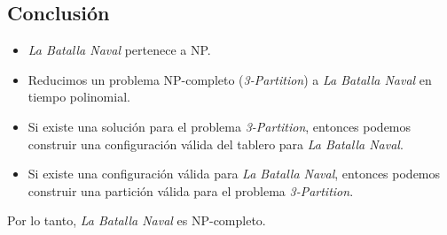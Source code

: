 \subsection*{Conclusión}

\begin{itemize}
    \item \textit{La Batalla Naval} pertenece a NP.
    \item Reducimos un problema NP-completo (\textit{3-Partition}) a \textit{La Batalla Naval} en tiempo polinomial.
    \item Si existe una solución para el problema \textit{3-Partition}, entonces podemos construir una configuración válida del tablero para \textit{La Batalla Naval}.
    \item Si existe una configuración válida para \textit{La Batalla Naval}, entonces podemos construir una partición válida para el problema \textit{3-Partition}.
\end{itemize}

Por lo tanto, \textit{La Batalla Naval} es NP-completo.